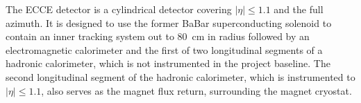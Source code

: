 The ECCE detector is a cylindrical detector covering
$\left|\eta\right| \leq 1.1$ and the full azimuth.  It is designed to use
the former BaBar superconducting solenoid to contain
an inner tracking system out to 80~cm in radius followed by an
electromagnetic calorimeter and the first of two longitudinal segments of
a hadronic calorimeter, which is not instrumented in the project baseline.  The second
longitudinal segment of the hadronic calorimeter, which is instrumented to
$|\eta| \leq 1.1$, also serves as
the magnet flux return, surrounding the magnet cryostat.